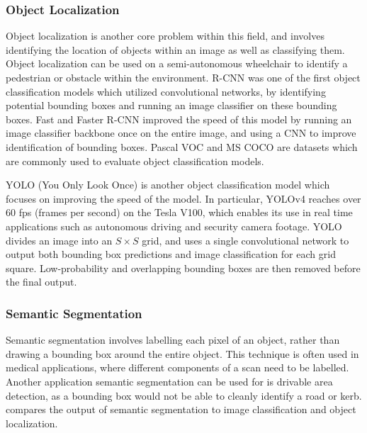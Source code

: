 \documentclass[12pt]{article}
\begin{document}
\subsubsection{Object Localization}
Object localization is another core problem within this field, and involves identifying the location of objects within an image
as well as classifying them. Object localization can be used on a semi-autonomous wheelchair to identify
a pedestrian or obstacle within the environment. R-CNN \cite{girshickRichFeatureHierarchies2013} was one of the
first object classification models which utilized convolutional networks, by identifying potential bounding boxes
and running an image classifier on these bounding boxes. Fast and Faster R-CNN \cite{girshickFastRCNN2015}\cite{renFasterRCNNRealTime2015}
improved the speed of this model by running an image classifier backbone once on the entire image, and using a CNN to improve
identification of bounding boxes. Pascal VOC \cite{everinghamPascalVisualObject2009} and MS COCO \cite{linMicrosoftCOCOCommon2014}
are datasets which are commonly used to evaluate object classification models.

YOLO (You Only Look Once) \cite{redmonYouOnlyLook2015}\cite{redmonYOLO9000BetterFaster2016}\cite{redmonYOLOv3IncrementalImprovement2018}\cite{bochkovskiyYOLOv4OptimalSpeed2020}
is another object classification model which focuses on improving the speed of the model. In particular, YOLOv4 \cite{bochkovskiyYOLOv4OptimalSpeed2020}
reaches over 60 fps (frames per second) on the Tesla V100, which enables its use in real time applications such as autonomous driving and security camera footage. %
YOLO divides an image into an $S\times S$ grid, and uses a single convolutional network to output both bounding box predictions and
image classification for each grid square. Low-probability and overlapping bounding boxes are then removed before the final output.

\subsubsection{Semantic Segmentation}
Semantic segmentation involves labelling each pixel of an object, rather than drawing a bounding box around the entire object.
This technique is often used in medical applications, where different components of a scan need to be labelled.
Another application semantic segmentation can be used for is drivable area detection, as a bounding box would not be able to cleanly
identify a road or kerb.  compares the output of semantic segmentation to image classification and object localization.
\end{document}
